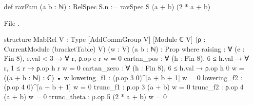 \begin{leancode}
def ravFam (a b : ℕ) : RelSpec S.n := ravSpec S (a + b) (2 * a + b)
\end{leancode}
\noindent File .
\begin{leancode}
structure MabRel {V : Type} [AddCommGroup V] [Module ℂ V]
    (ρ : CurrentModule (bracketTable) V) (w : V) (a b : ℕ) : Prop where
  raising : ∀ (e : Fin 8), e.val < 3 → ∀ r, ρ.op e r w = 0
  cartan_pos : ∀ (h : Fin 8), 6 ≤ h.val → ∀ r, 1 ≤ r → ρ.op h r w = 0
  cartan_zero : ∀ (h : Fin 8), 6 ≤ h.val → ρ.op h 0 w = ((a + b : ℕ) : ℂ) • w
  lowering_f1 : (ρ.op 3 0)^[a + b + 1] w = 0
  lowering_f2 : (ρ.op 4 0)^[a + b + 1] w = 0
  trunc_f1 : ρ.op 3 (a + b) w = 0
  trunc_f2 : ρ.op 4 (a + b) w = 0
  trunc_theta : ρ.op 5 (2 * a + b) w = 0
\end{leancode}


